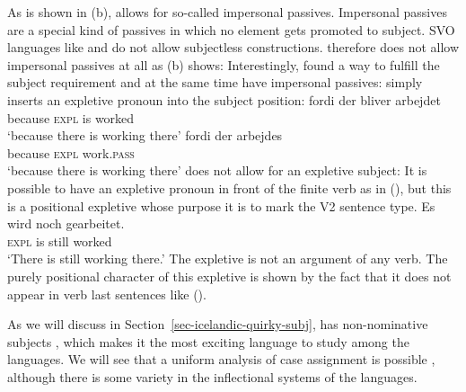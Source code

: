 As is shown in (b),  allows for so-called impersonal passives. Impersonal passives are
a special kind of passives in which no element gets promoted to subject. SVO languages like  and
 do not allow subjectless constructions.  therefore does not allow impersonal passives
at all as (b) shows:
\eal
{}
\zl
Interestingly,  found a way to fulfill the subject requirement and at the same time have
impersonal passives:  simply inserts an expletive pronoun into the subject position:
\eal
\label{ex-bliver-arbejder}
\ex 
\gll fordi der bliver arbejdet\\
     because \textsc{expl} is worked\\\danish
\glt `because there is working there'
\ex
\gll fordi   der arbejdes\\
     because  \textsc{expl} work.\textsc{pass}\\
\glt `because there is working there'
\zl
{} does not allow for an expletive subject:
\z
It is possible to have an expletive pronoun in front of the finite verb as in (), but this is
a positional expletive whose purpose it is to mark the V2 sentence type. 
\ea
\gll  Es wird noch gearbeitet.\\
      \textsc{expl} is still worked\\\german
\glt `There is still working there.'
\z
The expletive is not an argument of any verb. The purely positional character of this expletive is shown by the fact that it does not
appear in verb last sentences like ().%

As we will discuss in Section~\ref{sec-icelandic-quirky-subj},  has non-nominative subjects \citep{ZMT85a}, which makes it the most
exciting language to study among the  languages. We will see that a uniform analysis of case
assignment is possible \citep*{YMJ87}, although there is some variety in the inflectional systems of the  languages.

